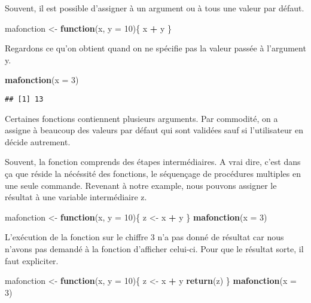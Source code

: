 \documentclass[]{book}
\newenvironment{Shaded}{\begin{snugshade}}{\end{snugshade}}
\newcommand{\KeywordTok}[1]{\textcolor[rgb]{0.13,0.29,0.53}{\textbf{#1}}}
\newcommand{\DataTypeTok}[1]{\textcolor[rgb]{0.13,0.29,0.53}{#1}}
\newcommand{\DecValTok}[1]{\textcolor[rgb]{0.00,0.00,0.81}{#1}}
\newcommand{\StringTok}[1]{\textcolor[rgb]{0.31,0.60,0.02}{#1}}
\newcommand{\ControlFlowTok}[1]{\textcolor[rgb]{0.13,0.29,0.53}{\textbf{#1}}}
\newcommand{\OperatorTok}[1]{\textcolor[rgb]{0.81,0.36,0.00}{\textbf{#1}}}
\newcommand{\NormalTok}[1]{#1}
\begin{document}
Souvent, il est possible d'assigner à un argument ou à tous une valeur
par défaut.

\begin{Shaded}
\begin{Highlighting}[]
\NormalTok{mafonction <-}\StringTok{ }\ControlFlowTok{function}\NormalTok{(x, }\DataTypeTok{y =} \DecValTok{10}\NormalTok{)\{}
\NormalTok{  x }\OperatorTok{+}\StringTok{ }\NormalTok{y}
\NormalTok{  \}}
\end{Highlighting}
\end{Shaded}

Regardons ce qu'on obtient quand on ne spécifie pas la valeur passée à
l'argument y.

\begin{Shaded}
\begin{Highlighting}[]
\KeywordTok{mafonction}\NormalTok{(}\DataTypeTok{x =} \DecValTok{3}\NormalTok{)}
\end{Highlighting}
\end{Shaded}

\begin{verbatim}
## [1] 13
\end{verbatim}

Certaines fonctions contiennent plusieurs arguments. Par commodité, on a
assigne à beaucoup des valeurs par défaut qui sont validées sauf si
l'utilisateur en décide autrement.

Souvent, la fonction comprends des étapes intermédiaires. A vrai dire,
c'est dans ça que réside la nécéssité des fonctions, le séquençage de
procédures multiples en une seule commande. Revenant à notre example,
nous pouvons assigner le résultat à une variable intermédiaire z.

\begin{Shaded}
\begin{Highlighting}[]
\NormalTok{mafonction <-}\StringTok{ }\ControlFlowTok{function}\NormalTok{(x, }\DataTypeTok{y =} \DecValTok{10}\NormalTok{)\{}
\NormalTok{  z <-}\StringTok{ }\NormalTok{x }\OperatorTok{+}\StringTok{ }\NormalTok{y}
\NormalTok{  \}}
\KeywordTok{mafonction}\NormalTok{(}\DataTypeTok{x =} \DecValTok{3}\NormalTok{)}
\end{Highlighting}
\end{Shaded}

L'exécution de la fonction sur le chiffre 3 n'a pas donné de résultat
car nous n'avons pas demandé à la fonction d'afficher celui-ci. Pour que
le résultat sorte, il faut expliciter.

\begin{Shaded}
\begin{Highlighting}[]
\NormalTok{mafonction <-}\StringTok{ }\ControlFlowTok{function}\NormalTok{(x, }\DataTypeTok{y =} \DecValTok{10}\NormalTok{)\{}
\NormalTok{  z <-}\StringTok{ }\NormalTok{x }\OperatorTok{+}\StringTok{ }\NormalTok{y}
  \KeywordTok{return}\NormalTok{(z)}
\NormalTok{  \}}
\KeywordTok{mafonction}\NormalTok{(}\DataTypeTok{x =} \DecValTok{3}\NormalTok{)}
\end{Highlighting}
\end{Shaded}
\end{document}

